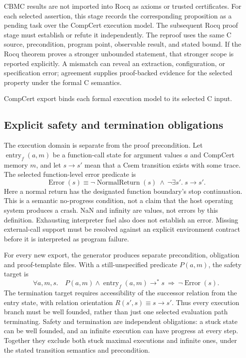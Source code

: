 \documentclass[manuscript, screen, review]{acmart}
\begin{document}
CBMC results are not imported into Rocq as axioms or trusted certificates.
For each selected assertion, this stage records the corresponding proposition
as a pending task over the CompCert execution model. The subsequent Rocq
proof stage must establish or refute it independently. The reproof uses the
same C source, precondition, program point, observable result, and stated
bound. If the Rocq theorem proves a stronger
unbounded statement, that stronger scope is reported explicitly. A
mismatch can reveal an extraction, configuration, or specification error;
agreement supplies proof-backed evidence for the selected property under
the formal C semantics.

CompCert export binds each formal execution model to its selected C input.


\subsection{Explicit safety and termination obligations}

The execution domain is separate from the proof precondition. Let
$\operatorname{entry}_f(a,m)$ be a function-call state for argument values
$a$ and CompCert memory $m$, and let $s\longrightarrow s'$ mean that a
Csem transition exists with some trace. The selected function-level error
predicate is
\[
 \operatorname{Error}(s) \equiv
 \neg\operatorname{NormalReturn}(s)\ \land\
 \neg\exists s'.\;s\longrightarrow s'.
\]
Here a normal return has the designated function boundary's stop
continuation. This is a semantic no-progress condition, not a claim that
the host operating system produces a crash. NaN and infinity are values,
not errors by this definition. Exhausting interpreter fuel also does not
establish an error. Missing external-call support must be resolved against
an explicit environment contract before it is interpreted as program failure.

For every new export, the generator produces separate precondition,
obligation and proof-template files. With a still-unspecified predicate
$P(a,m)$, the safety target is
\[
 \forall a,m,s.\quad P(a,m)\land
 \operatorname{entry}_f(a,m)\longrightarrow^{*}s
 \ \Rightarrow\ \neg\operatorname{Error}(s).
\]
The termination target requires accessibility of the successor relation
from the entry state, with relation orientation
$R(s',s)\equiv s\longrightarrow s'$. Thus every execution branch must be
well founded, rather than just one selected evaluation path terminating.
Safety and termination are independent obligations: a stuck state can be
well founded, and an infinite execution can have progress at every step.
Together they exclude both stuck maximal executions and infinite ones,
under the stated transition semantics and precondition.
\end{document}
